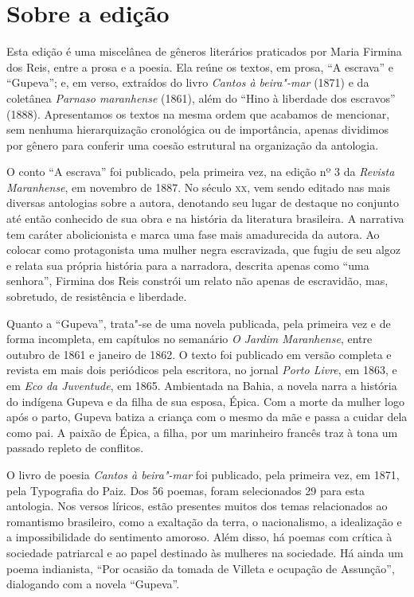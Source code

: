 \section{Sobre a edição}

Esta edição é uma miscelânea de gêneros literários praticados por Maria
Firmina dos
Reis, entre a prosa e a poesia. Ela reúne os textos, em prosa, ``A
escrava'' e ``Gupeva''; e, em verso, extraídos do livro \emph{Cantos à
beira"-mar} (1871) e da coletânea \emph{Parnaso maranhense} (1861), além
do ``Hino à liberdade dos escravos'' (1888). Apresentamos os textos na
mesma ordem que acabamos de mencionar, sem nenhuma hierarquização
cronológica ou de importância, apenas dividimos por gênero para conferir
uma coesão estrutural na organização da antologia.

O conto ``A escrava'' foi publicado, pela primeira vez, na edição nº 3
da \emph{Revista Maranhense}, em novembro de 1887. No século \textsc{xx}, vem
sendo editado nas mais diversas antologias sobre a autora, denotando seu
lugar de destaque no conjunto até então conhecido de sua obra e na
história da literatura brasileira. A narrativa tem caráter abolicionista
e marca uma fase mais amadurecida da autora. Ao colocar como
protagonista uma mulher negra escravizada, que fugiu de seu algoz e
relata sua própria história para a narradora, descrita apenas como ``uma
senhora'', Firmina dos Reis constrói um relato não apenas de escravidão,
mas, sobretudo, de resistência e liberdade.

Quanto a ``Gupeva'', trata"-se de uma novela publicada, pela primeira vez
e de forma incompleta, em capítulos no semanário \emph{O Jardim
Maranhense}, entre outubro de 1861 e janeiro de 1862. O texto foi
publicado em versão completa e revista em mais dois periódicos pela
escritora, no jornal \emph{Porto Livre}, em 1863, e em \emph{Eco da
Juventude}, em 1865. Ambientada na Bahia, a novela narra a história do
indígena Gupeva e da filha de sua esposa, Épica. Com a morte da mulher
logo após o parto, Gupeva batiza a criança com o mesmo da mãe e passa a
cuidar dela como pai. A paixão de Épica, a filha, por um marinheiro
francês traz à tona um passado repleto de conflitos.

O livro de poesia \emph{Cantos à beira"-mar} foi publicado, pela primeira
vez, em 1871, pela Typografia do Paiz. Dos 56 poemas, foram selecionados
29 para esta antologia. Nos versos líricos, estão presentes muitos dos
temas relacionados ao romantismo brasileiro, como a exaltação da terra,
o nacionalismo, a idealização e a impossibilidade do sentimento amoroso.
Além disso, há poemas com crítica à sociedade patriarcal e ao papel
destinado às mulheres na sociedade. Há ainda um poema indianista, ``Por
ocasião da tomada de Villeta e ocupação de Assunção'', dialogando com a
novela ``Gupeva''.


